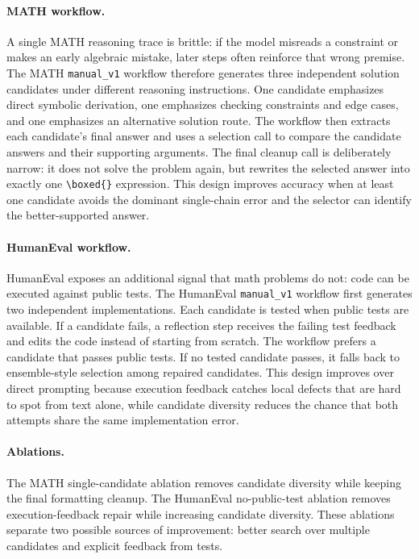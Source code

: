 \documentclass{article}
\begin{document}
\paragraph{MATH workflow.} A single MATH reasoning trace is brittle: if the model misreads a constraint or makes an early algebraic mistake, later steps often reinforce that wrong premise. The MATH \texttt{manual\_v1} workflow therefore generates three independent solution candidates under different reasoning instructions. One candidate emphasizes direct symbolic derivation, one emphasizes checking constraints and edge cases, and one emphasizes an alternative solution route. The workflow then extracts each candidate's final answer and uses a selection call to compare the candidate answers and their supporting arguments. The final cleanup call is deliberately narrow: it does not solve the problem again, but rewrites the selected answer into exactly one \texttt{\textbackslash boxed\{\}} expression. This design improves accuracy when at least one candidate avoids the dominant single-chain error and the selector can identify the better-supported answer.

\paragraph{HumanEval workflow.} HumanEval exposes an additional signal that math problems do not: code can be executed against public tests. The HumanEval \texttt{manual\_v1} workflow first generates two independent implementations. Each candidate is tested when public tests are available. If a candidate fails, a reflection step receives the failing test feedback and edits the code instead of starting from scratch. The workflow prefers a candidate that passes public tests. If no tested candidate passes, it falls back to ensemble-style selection among repaired candidates. This design improves over direct prompting because execution feedback catches local defects that are hard to spot from text alone, while candidate diversity reduces the chance that both attempts share the same implementation error.

\paragraph{Ablations.} The MATH single-candidate ablation removes candidate diversity while keeping the final formatting cleanup. The HumanEval no-public-test ablation removes execution-feedback repair while increasing candidate diversity. These ablations separate two possible sources of improvement: better search over multiple candidates and explicit feedback from tests.
\end{document}
